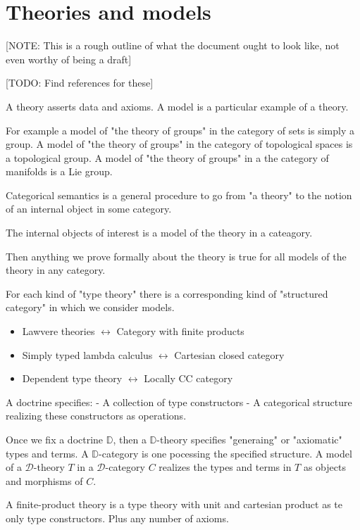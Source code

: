 \section{Theories and models}

[NOTE: This is a rough outline of what the document ought to look like, not even worthy of being a draft]

[TODO: Find references for these]
\begin{defin}
    A theory asserts data and axioms.
    A model is a particular example of a theory.
\end{defin}

For example a model of "the theory of groups" in the category of sets is simply a group. A model of "the theory of groups" in the category of topological spaces is a topological group. A model of "the theory of groups" in a the category of manifolds is a Lie group.

Categorical semantics is a general procedure to go from "a theory" to the notion of an internal object in some category.

The internal objects of interest is a model of the theory in a cateagory.

Then anything we prove formally about the theory is true for all models of the theory in any category.

For each kind of "type theory" there is a corresponding kind of "structured category" in which we consider models.

\begin{itemize}
\item Lawvere theories $\leftrightarrow$ Category with finite products
\item Simply typed lambda calculus $\leftrightarrow$ Cartesian closed category
\item Dependent type theory $\leftrightarrow$ Locally CC category
\end{itemize}

A doctrine specifies:
 - A collection of type constructors
 - A categorical structure realizing these constructors as operations.

Once we fix a doctrine $\mathbb{D}$, then a $\mathbb{D}$-theory specifies "generaing" or "axiomatic" types and terms.
A $\mathbb{D}$-category is one pocessing the specified structure.
A model of a $\mathcal{D}$-theory $T$ in a $\mathcal{D}$-category $C$ realizes the types and terms in $T$ as objects and morphisms of $C$.

A finite-product theory is a type theory with unit and cartesian product as te only type constructors. Plus any number of axioms.

